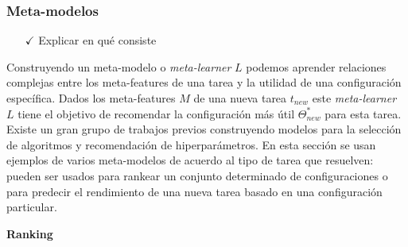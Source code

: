 \subsubsection{Meta-modelos}

\begin{itemize}
	\item[$\checkmark$] Explicar en qué consiste
\end{itemize}

Construyendo un meta-modelo o \textit{meta-learner} $L$ podemos aprender relaciones complejas entre los meta-features de una tarea y la utilidad de una configuración específica. Dados los meta-features $M$ de una nueva tarea $t_{new}$ este \textit{meta-learner} $L$ tiene el objetivo de recomendar la configuración más útil $\Theta_{new}^*$ para esta tarea. Existe un gran grupo de trabajos previos construyendo modelos para la selección de algoritmos y recomendación de hiperparámetros. En esta sección se usan ejemplos de varios meta-modelos de acuerdo al tipo de tarea que resuelven: pueden ser usados para rankear un conjunto determinado de configuraciones o para predecir el rendimiento de una nueva tarea basado en una configuración particular. %

\quad

\textbf{Ranking}


